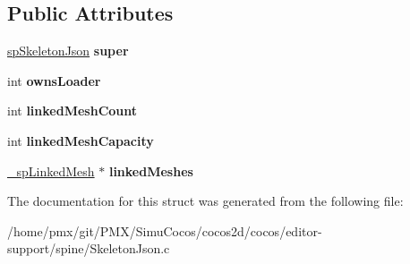 \subsection*{Public Attributes}
\begin{DoxyCompactItemize}
\item 
\mbox{\label{struct__spSkeletonJson_a23f11521b275231e3efe80840d39d793}} 
\hyperlink{structspSkeletonJson}{sp\+Skeleton\+Json} {\bfseries super}
\item 
\mbox{\label{struct__spSkeletonJson_a258ed379882c3ae9f2907793492037ba}} 
int {\bfseries owns\+Loader}
\item 
\mbox{\label{struct__spSkeletonJson_ac5b1e6648c1130406681a595e2b7e10a}} 
int {\bfseries linked\+Mesh\+Count}
\item 
\mbox{\label{struct__spSkeletonJson_a3cc36c1c003dd33cd4ae0725a88a1b95}} 
int {\bfseries linked\+Mesh\+Capacity}
\item 
\mbox{\label{struct__spSkeletonJson_aff779023c30eda8c9e8f60c54eaad20e}} 
\hyperlink{struct__spLinkedMesh}{\+\_\+sp\+Linked\+Mesh} $\ast$ {\bfseries linked\+Meshes}
\end{DoxyCompactItemize}


The documentation for this struct was generated from the following file\+:\begin{DoxyCompactItemize}
\item 
/home/pmx/git/\+P\+M\+X/\+Simu\+Cocos/cocos2d/cocos/editor-\/support/spine/Skeleton\+Json.\+c\end{DoxyCompactItemize}
